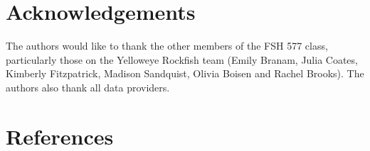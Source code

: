 \documentclass[
]{scrartcl}
\begin{document}
\newpage{}

\section{Acknowledgements}\label{sec-acknowledgements}

The authors would like to thank the other members of the FSH 577 class,
particularly those on the Yelloweye Rockfish team (Emily Branam, Julia
Coates, Kimberly Fitzpatrick, Madison Sandquist, Olivia Boisen and
Rachel Brooks). The authors also thank all data providers.

\newpage{}

\section{References}\label{references}
\end{document}
